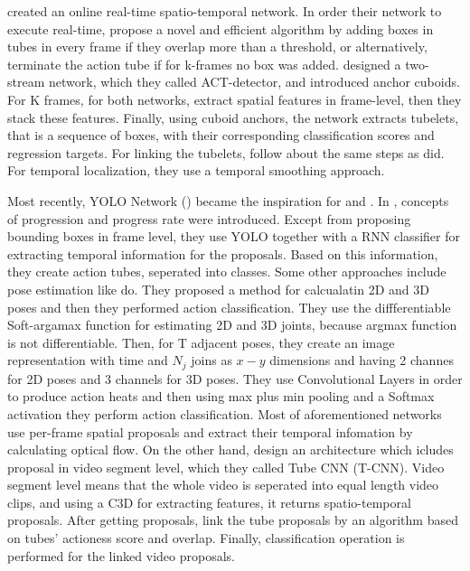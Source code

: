 \cite{singh2016online} created an online real-time spatio-temporal network. In order their network to execute real-time,  \cite{singh2016online} propose a novel and efficient algorithm
by adding boxes in tubes in every frame if they overlap more than a threshold, or alternatively, terminate the action tube if for k-frames no box was added.  \cite{kalogeiton17iccv:hal-01519812}
designed a two-stream network, which they called ACT-detector, and introduced anchor cuboids. For K frames, for both networks, \cite{kalogeiton17iccv:hal-01519812} extract spatial
features in frame-level, then they stack these features. Finally, using cuboid anchors, the network extracts tubelets, that is a sequence of boxes, with their corresponding classification
scores and regression targets. For linking the tubelets, \cite{kalogeiton17iccv:hal-01519812} follow about the same steps as \cite{singh2016online} did. For temporal localization, they use
a temporal smoothing approach. \par

Most recently, YOLO Network (\cite{DBLP:journals/corr/RedmonDGF15}) became the inspiration for \cite{DBLP:journals/corr/abs-1903-00304} and
\cite{DBLP:journals/corr/abs-1802-08362}. In \cite{DBLP:journals/corr/abs-1903-00304}, concepts of progression and progress
rate were introduced. Except from proposing bounding boxes in frame level, they use YOLO together with a RNN classifier for extracting temporal information for the proposals.
Based on this information, they create action tubes, seperated into classes. Some other approaches include pose estimation like \cite{DBLP:journals/corr/abs-1802-09232} do.%
They proposed a method for calcualatin 2D and 3D poses and then they performed action classification. They use the diffferentiable Soft-argamax function for estimating 2D and 3D joints, because
argmax function is not differentiable. Then, for T adjacent poses, they create an image representation with time and $N_j$ joins as $x-y$ dimensions and having 2 channes for 2D poses and 3
channels for 3D poses. They use Convolutional Layers in order to produce action heats and then using max plus min pooling and a Softmax activation they perform action classification.
Most of aforementioned networks use per-frame spatial proposals and extract their temporal infomation by calculating optical flow. On the other hand, \cite{DBLP:journals/corr/HouCS17} design
an architecture which icludes proposal in video segment level, which they called Tube CNN (T-CNN). Video segment level means that the whole video is seperated into equal length video clips, and
using a C3D for extracting features, it returns spatio-temporal proposals. After getting proposals, \cite{DBLP:journals/corr/HouCS17} link the tube proposals by an algorithm based on tubes'
actioness score and overlap. Finally, classification operation is performed for the linked video proposals.


% 